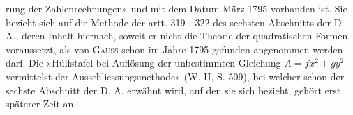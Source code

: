 \noindent rung der Zahlenrechnungen« und mit dem Datum März 1795 vorhanden ist. Sie bezieht sich auf die Methode der artt. 319—322 des sechsten Abschnitts der D. A., deren Inhalt hiernach, soweit er nicht die Theorie der quadratischen Formen voraussetzt, als von \textsc{Gauss} schon im Jahre 1795 gefunden angenommen werden darf. Die »Hülfstafel bei Auflösung der unbestimmten Gleichung \(A=fx^2+gy^2\) vermittelst der Ausschliessungsmethode« (W. II, S. 509), bei welcher schon der sechste Abschnitt der D. A. erwähnt wird, auf den sie sich bezieht, gehört erst späterer Zeit an.
